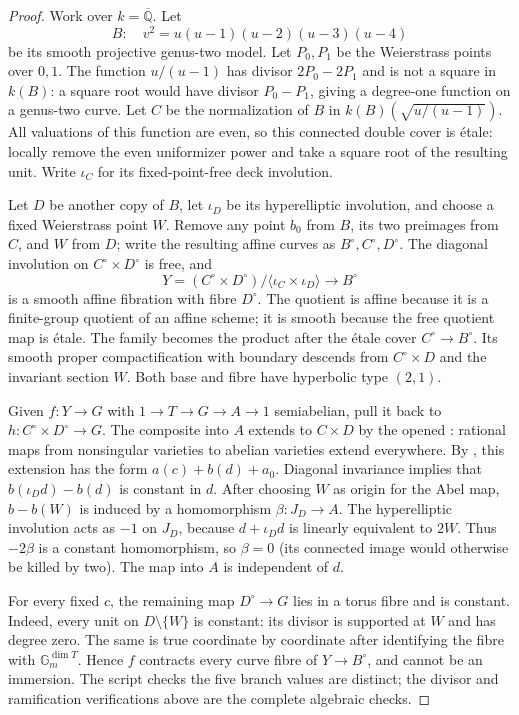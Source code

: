 \begin{proof}
Work over $k=\overline{\mathbb Q}$. Let
\[
 B:\quad v^2=u(u-1)(u-2)(u-3)(u-4)
\]
be its smooth projective genus-two model. Let $P_0,P_1$ be the
Weierstrass points over $0,1$. The function $u/(u-1)$ has divisor
$2P_0-2P_1$ and is not a square in $k(B)$: a square root would have
divisor $P_0-P_1$, giving a degree-one function on a genus-two curve.
Let $C$ be the normalization of $B$ in
$k(B)(\sqrt{u/(u-1)})$. All valuations of this function are even,
so this connected double cover is \'etale: locally remove the even
uniformizer power and take a square root of the resulting unit.
Write $\iota_C$ for its fixed-point-free deck involution.

Let $D$ be another copy of $B$, let $\iota_D$ be its hyperelliptic
involution, and choose a fixed Weierstrass point $W$. Remove any point
$b_0$ from $B$, its two preimages from $C$, and $W$ from $D$;
write the resulting affine curves as $B^\circ,C^\circ,D^\circ$.
The diagonal involution on $C^\circ\times D^\circ$ is free, and
\[
 Y=(C^\circ\times D^\circ)/\langle\iota_C\times\iota_D\rangle
         \longrightarrow B^\circ
\]
is a smooth affine fibration with fibre $D^\circ$. The quotient is
affine because it is a finite-group quotient of an affine scheme;
it is smooth because the free quotient map is \'etale. The family
becomes the product after the \'etale cover $C^\circ\to B^\circ$.
Its smooth proper compactification with boundary descends from
$C^\circ\times D$ and the invariant section $W$. Both base and
fibre have hyperbolic type $(2,1)$.

Given $f:Y\to G$ with $1\to T\to G\to A\to1$ semiabelian,
pull it back to $h:C^\circ\times D^\circ\to G$.
The composite into $A$ extends to $C\times D$ by the opened
\cite[I, Theorem 3.2]{AB_MilneAV}: rational maps from nonsingular
varieties to abelian varieties extend everywhere. By
\cite[I, Corollary 1.5]{AB_MilneAV}, this extension has the form
$a(c)+b(d)+a_0$. Diagonal invariance implies that
$b(\iota_Dd)-b(d)$ is constant in $d$. After choosing $W$ as origin
for the Abel map, $b-b(W)$ is induced by a homomorphism
$\beta:J_D\to A$. The hyperelliptic involution acts as $-1$ on
$J_D$, because $d+\iota_Dd$ is linearly equivalent to $2W$.
Thus $-2\beta$ is a constant homomorphism, so $\beta=0$ (its
connected image would otherwise be killed by two). The map into
$A$ is independent of $d$.

For every fixed $c$, the remaining map $D^\circ\to G$ lies in a
torus fibre and is constant. Indeed, every unit on $D\setminus\{W\}$
is constant: its divisor is supported at $W$ and has degree zero.
The same is true coordinate by coordinate after identifying the
fibre with $\mathbb G_m^{\dim T}$. Hence $f$ contracts every curve
fibre of $Y\to B^\circ$, and cannot be an immersion. The script
checks the five branch values are distinct; the divisor and
ramification verifications above are the complete algebraic checks.


\end{proof}
